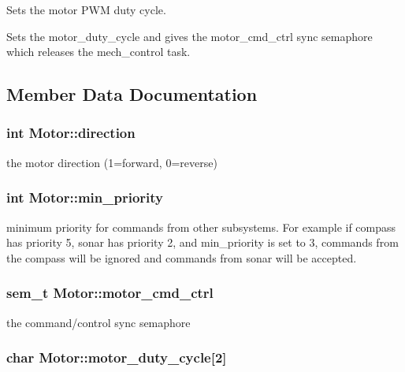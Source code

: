 Sets the motor P\-W\-M duty cycle. 

Sets the motor\-\_\-duty\-\_\-cycle and gives the motor\-\_\-cmd\-\_\-ctrl sync semaphore which releases the mech\-\_\-control task. 

\subsection{Member Data Documentation}
\hypertarget{classMotor_a7d7c98b5afa45656905708e54ff7fb9a}{
\subsubsection[{direction}]{\setlength{\rightskip}{0pt plus 5cm}int Motor\-::direction\hspace{0.3cm}{\ttfamily [protected]}}}\label{classMotor_a7d7c98b5afa45656905708e54ff7fb9a}
the motor direction (1=forward, 0=reverse) \hypertarget{classMotor_a0125717053068acb08b430d820bfc413}{
\subsubsection[{min\-\_\-priority}]{\setlength{\rightskip}{0pt plus 5cm}int Motor\-::min\-\_\-priority\hspace{0.3cm}{\ttfamily [protected]}}}\label{classMotor_a0125717053068acb08b430d820bfc413}
minimum priority for commands from other subsystems. For example if compass has priority 5, sonar has priority 2, and min\-\_\-priority is set to 3, commands from the compass will be ignored and commands from sonar will be accepted. \hypertarget{classMotor_a827a1d2b453a804d389cdafbf0685022}{
\subsubsection[{motor\-\_\-cmd\-\_\-ctrl}]{\setlength{\rightskip}{0pt plus 5cm}sem\-\_\-t Motor\-::motor\-\_\-cmd\-\_\-ctrl\hspace{0.3cm}{\ttfamily [protected]}}}\label{classMotor_a827a1d2b453a804d389cdafbf0685022}
the command/control sync semaphore \hypertarget{classMotor_aac6cb55808e4f1da0506d0cc6c314e41}{
\subsubsection[{motor\-\_\-duty\-\_\-cycle}]{\setlength{\rightskip}{0pt plus 5cm}char Motor\-::motor\-\_\-duty\-\_\-cycle\mbox{[}2\mbox{]}\hspace{0.3cm}{\ttfamily [protected]}}}\label{classMotor_aac6cb55808e4f1da0506d0cc6c314e41}
